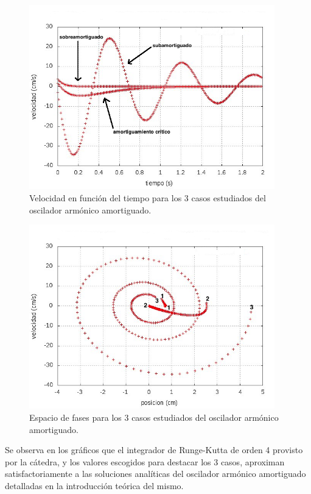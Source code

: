 \documentclass[a4paper,12pt]{article}
\begin{document}
\begin{figure}[H]
\begin{center}
\includegraphics[height=8cm]{grafico_ej2_vVSt.jpg}
\caption[width=5cm]{Velocidad en funci\'on del tiempo para los 3 casos estudiados del oscilador arm\'onico amortiguado.}
\end{center}
\end{figure}

\begin{figure}[H]
\begin{center}
\includegraphics[height=8cm]{grafico_ej2_xVSv.jpg}
\caption[width=5cm]{Espacio de fases para los 3 casos estudiados del oscilador arm\'onico amortiguado.}
\end{center}
\end{figure}

Se observa en los gr\'aficos que el integrador de Runge-Kutta de orden 4 provisto por la c\'atedra, y los valores escogidos para destacar los 3 casos, aproximan satisfactoriamente a las soluciones anal\'iticas del oscilador arm\'onico amortiguado detalladas en la introducci\'on te\'orica del mismo.
\end{document}
